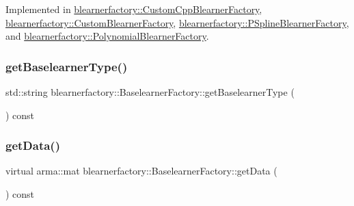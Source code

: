 Implemented in \mbox{\hyperlink{classblearnerfactory_1_1_custom_cpp_blearner_factory_ac98fae043e6822605261c7c6f7125e8c}{blearnerfactory\+::\+Custom\+Cpp\+Blearner\+Factory}}, \mbox{\hyperlink{classblearnerfactory_1_1_custom_blearner_factory_aad915d1ac58a323d1584d27f8cdace56}{blearnerfactory\+::\+Custom\+Blearner\+Factory}}, \mbox{\hyperlink{classblearnerfactory_1_1_p_spline_blearner_factory_a877072332da418456dcbcb27c572c1e7}{blearnerfactory\+::\+P\+Spline\+Blearner\+Factory}}, and \mbox{\hyperlink{classblearnerfactory_1_1_polynomial_blearner_factory_ac0c7f742da0a2de444e91a0cfb0a9384}{blearnerfactory\+::\+Polynomial\+Blearner\+Factory}}.

\mbox{\label{classblearnerfactory_1_1_baselearner_factory_a05d5c00f7a434548868c4ad21d0f5fda}} 
\subsubsection{\texorpdfstring{get\+Baselearner\+Type()}{getBaselearnerType()}}
{\footnotesize\ttfamily std\+::string blearnerfactory\+::\+Baselearner\+Factory\+::get\+Baselearner\+Type (\begin{DoxyParamCaption}{ }\end{DoxyParamCaption}) const}

\mbox{\label{classblearnerfactory_1_1_baselearner_factory_aa3e4580bca870ca3b742dda6c820e1e6}} 
\subsubsection{\texorpdfstring{get\+Data()}{getData()}}
{\footnotesize\ttfamily virtual arma\+::mat blearnerfactory\+::\+Baselearner\+Factory\+::get\+Data (\begin{DoxyParamCaption}{ }\end{DoxyParamCaption}) const\hspace{0.3cm}{\ttfamily [pure virtual]}}



